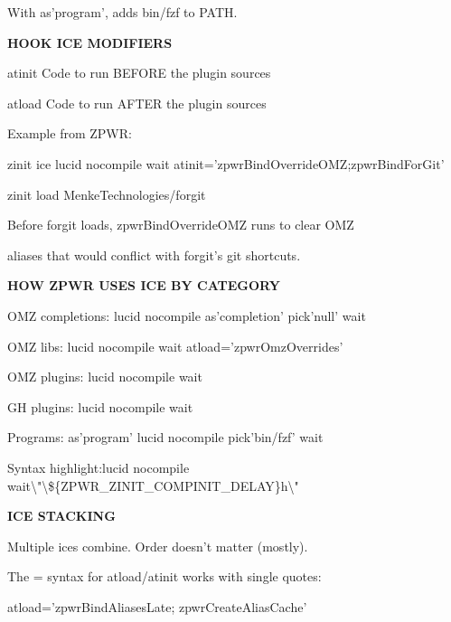\documentclass[11pt,a4paper,twoside]{book}
\begin{document}
With as'program', adds bin/fzf to PATH.


\vspace{12pt}
{\bfseries\color{neonyellow} HOOK ICE MODIFIERS}\vspace{4pt}

atinit         Code to run BEFORE the plugin sources

atload         Code to run AFTER the plugin sources

Example from ZPWR:

\begin{codebox}
zinit ice lucid nocompile wait atinit='zpwrBindOverrideOMZ;zpwrBindForGit'\\
\end{codebox}

zinit load MenkeTechnologies/forgit

Before forgit loads, zpwrBindOverrideOMZ runs to clear OMZ

aliases that would conflict with forgit's git shortcuts.


\vspace{12pt}
{\bfseries\color{neonyellow} HOW ZPWR USES ICE BY CATEGORY}\vspace{4pt}

OMZ completions: lucid nocompile as'completion' pick'null' wait

\begin{codebox}
OMZ libs:        lucid nocompile wait atload='zpwrOmzOverrides'\\
\end{codebox}

OMZ plugins:     lucid nocompile wait

GH plugins:      lucid nocompile wait

Programs:        as'program' lucid nocompile pick'bin/fzf' wait

Syntax highlight:lucid nocompile wait\textbackslash{}"\textbackslash{}\$\{ZPWR\_ZINIT\_COMPINIT\_DELAY\}h\textbackslash{}"


\vspace{12pt}
{\bfseries\color{neonyellow} ICE STACKING}\vspace{4pt}

Multiple ices combine. Order doesn't matter (mostly).

The = syntax for atload/atinit works with single quotes:

\begin{codebox}
atload='zpwrBindAliasesLate; zpwrCreateAliasCache'\\
\end{codebox}
\end{document}
